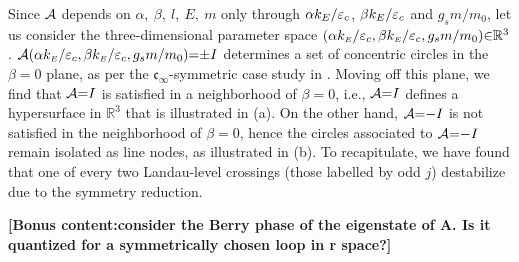 \documentclass[aps, prb, showpacs, twocolumn, notitlepage, superscriptaddress]{revtex4-1}
\begin{document}
Since ${\cal A}$ depends on $\alpha,~\beta,~l,~E,~m$ only through $\alpha k_E /\varepsilon_c$, $\beta k_E /\varepsilon_c$ and $g_sm/m_0$, let us consider the three-dimensional parameter space $(\alpha k_{\scriptscriptstyle{E}}/\varepsilon_c,\beta k_{\scriptscriptstyle{E}}/\varepsilon_c,g_sm/m_0){\in} \mathbb{R}^3$.  ${\cal A}(\alpha k_{\scriptscriptstyle{E}}/\varepsilon_c,\beta k_{\scriptscriptstyle{E}}/\varepsilon_c,g_sm/m_0){=}{\pm} I$ determines a set of concentric circles in the $\beta{=}0$ plane, as per the $\mathfrak{c}_{\infty}$-symmetric case study in . Moving off this plane, we find that ${\cal A}{=}I$ is satisfied in a  neighborhood of $\beta{=}0$, i.e., ${\cal A}{=}I$ defines a hypersurface in $\mathbb{R}^3$ that is illustrated in (a). On the other hand, ${\cal A}{=}{-}I$ is not satisfied in the neighborhood of $\beta{=}0$, hence the circles associated to ${\cal A}{=}{-}I$ remain isolated as line nodes, as illustrated in (b). To recapitulate, we have found that one of every two Landau-level crossings (those labelled by odd $j$) destabilize due to the symmetry reduction.

\textbf{[Bonus content:consider the Berry phase of the eigenstate of A. Is it quantized for a symmetrically chosen loop in r space?]}
\end{document}
